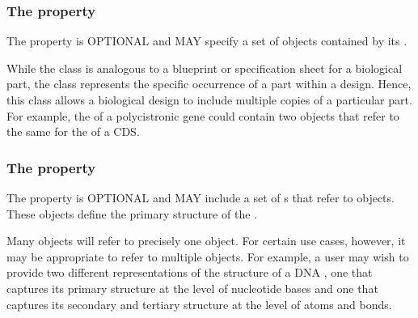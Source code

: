 \subsubsection*{The  property}
\label{sec:components}

The  property is OPTIONAL and MAY specify a set of  objects contained by its .

While the  class is analogous to a blueprint or specification sheet for a biological part, the  class represents the specific occurrence of a part within a design. Hence, this class allows a biological design to include multiple copies of a particular part. For example, the  of a polycistronic gene could contain two  objects that refer to the same  for the  of a CDS.

\subsubsection*{The  property}
\label{sec:sequences}
The  property is OPTIONAL and MAY include a set of s that refer to  objects. These objects define the primary structure of the .

Many  objects will refer to precisely one  object. For certain use cases, however, it may be appropriate to refer to multiple  objects. For example, a user may wish to provide two different representations of the structure of a DNA , one that captures its primary structure at the level of nucleotide bases and one that captures its secondary and tertiary structure at the level of atoms and bonds. 

